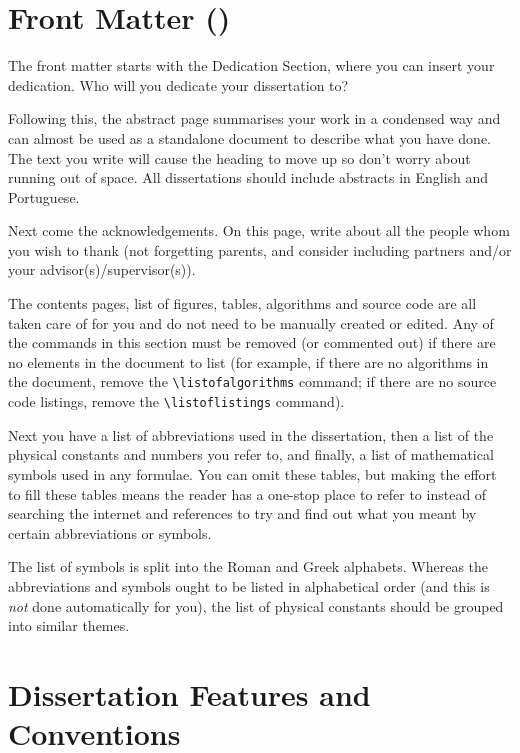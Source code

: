 \section{Front Matter ()}
\label{sec:frontmatter}

The front matter starts with the Dedication Section, where you can insert your dedication. Who will you dedicate your dissertation to?

Following this, the abstract page summarises your work in a condensed way and can almost be used as a standalone document to describe what you have done. The text you write will cause the heading to move up so don't worry about running out of space. All dissertations should include abstracts in English and Portuguese.

Next come the acknowledgements. On this page, write about all the people whom you wish to thank (not forgetting parents, and consider including partners and/or your advisor(s)/supervisor(s)).

The contents pages, list of figures, tables, algorithms and source code are all taken care of for you and do not need to be manually created or edited. Any of the commands in this section must be removed (or commented out) if there are no elements in the document to list (for example, if there are no algorithms in the document, remove the \texttt{\textbackslash listofalgorithms} command; if there are no source code listings, remove the \texttt{\textbackslash listoflistings} command).

Next you have a list of abbreviations used in the dissertation, then a list of the physical constants and numbers you refer to, and finally, a list of mathematical symbols used in any formulae. You can omit these tables, but making the effort to fill these tables means the reader has a one-stop place to refer to instead of searching the internet and references to try and find out what you meant by certain abbreviations or symbols.

The list of symbols is split into the Roman and Greek alphabets. Whereas the abbreviations and symbols ought to be listed in alphabetical order (and this is \emph{not} done automatically for you), the list of physical constants should be grouped into similar themes.


\section{Dissertation Features and Conventions}\label{ThesisConventions}


